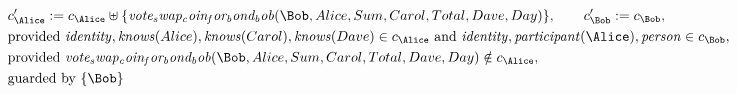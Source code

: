 \begin{align*}
&
c'_
{
\Alice
}
 := 
c_
{
\Alice
}
 \uplus 
\{
\mathit{
vote_swap_coin_for_bond_bob
}
(
\Bob
,
Alice
,
Sum
,
Carol
,
Total
,
Dave
,
Day
)
\}
, \qquad 
c'_
{
\Bob
}
 := 
c_
{
\Bob
}
,\\
&
\text{provided } 
\mathit{
identity
}
,
\mathit{
knows
}
(
Alice
)
,
\mathit{
knows
}
(
Carol
)
,
\mathit{
knows
}
(
Dave
)
 \in c_
{
\Alice
}
 \text{ and } 
\mathit{
identity
}
,
\mathit{
participant
}
(
\Alice
)
,
\mathit{
person
}
 \in c_
{
\Bob
}
,\\
&
\text{provided } 
\mathit{
vote_swap_coin_for_bond_bob
}
(
\Bob
,
Alice
,
Sum
,
Carol
,
Total
,
Dave
,
Day
)
 \notin c_
{
\Alice
}
,\\
&
\text{guarded by } \{
\Bob
\}
\end{align*}

